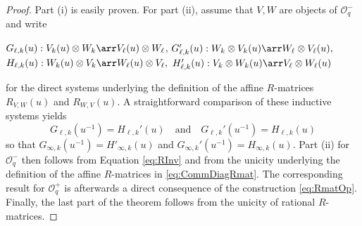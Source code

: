 \documentclass[11pt]{amsart}
\theoremstyle{definition}
\theoremstyle{remark}
\numberwithin{equation}{section}
\begin{document}
\begin{proof} Part (i) is easily proven. For part (ii), assume that $V,W$ are objects of $\mathcal{O}^-_q$ and write
\begin{center}
$G_{\ell,k}(u):V_k(u)\otimes W_k \arr V_{\ell}(u)\otimes W_{\ell}$, \qquad $G_{\ell,k}'(u):W_k\otimes V_k(u)\arr W_{\ell}\otimes V_{\ell}(u),$ \\
$H_{\ell,k}(u):W_k(u)\otimes V_k \arr W_{\ell}(u)\otimes V_{\ell},$ \qquad $H_{\ell,k}'(u):V_k\otimes W_k(u) \arr V_{\ell}\otimes W_{\ell}(u)$
\end{center}
for the direct systems underlying the definition of the affine $R$-matrices $R_{V,W}(u)$ and $R_{W,V}(u)$. A straightforward comparison of these inductive systems yields
$$G_{\ell,k}(u^{-1})=H_{\ell,k}'(u) \quad \text{and} \quad G_{\ell,k}'(u^{-1}) = H_{\ell,k}(u)$$
so that
$G_{\infty,k}(u^{-1}) = H'_{\infty,k}(u)$ and $G_{\infty,k}'(u^{-1})=H_{\infty,k}(u)$.
Part (ii) for $\mathcal{O}_q^-$ then follows from Equation \eqref{eq:RInv} and from the unicity underlying the definition of the affine $R$-matrices in \eqref{eq:CommDiagRmat}. The corresponding result for $\mathcal{O}^+_q$ is afterwards a direct consequence of the construction \eqref{eq:RmatOp}. Finally, the last part of the theorem follows from the unicity of rational $R$-matrices.
\end{proof}
\end{document}
